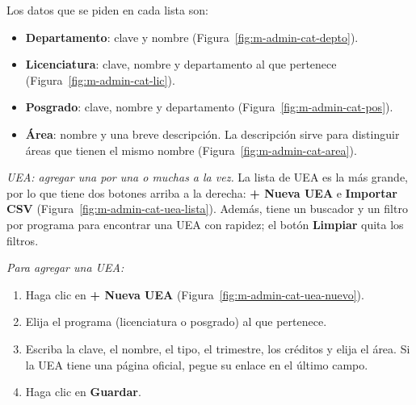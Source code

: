 Los datos que se piden en cada lista son:

\begin{itemize}
    \item \textbf{Departamento}: clave y nombre (Figura~\ref{fig:m-admin-cat-depto}).
    \item \textbf{Licenciatura}: clave, nombre y departamento al que pertenece (Figura~\ref{fig:m-admin-cat-lic}).
    \item \textbf{Posgrado}: clave, nombre y departamento (Figura~\ref{fig:m-admin-cat-pos}).
    \item \textbf{Área}: nombre y una breve descripción. La descripción sirve para distinguir áreas que tienen el mismo nombre (Figura~\ref{fig:m-admin-cat-area}).
\end{itemize}





\textit{UEA: agregar una por una o muchas a la vez.} La lista de UEA es la más grande, por lo que tiene dos botones arriba a la derecha: \textbf{+ Nueva UEA} e \textbf{Importar CSV} (Figura~\ref{fig:m-admin-cat-uea-lista}). Además, tiene un buscador y un filtro por programa para encontrar una UEA con rapidez; el botón \textbf{Limpiar} quita los filtros.


\textit{Para agregar una UEA:}
\begin{enumerate}
    \item Haga clic en \textbf{+ Nueva UEA} (Figura~\ref{fig:m-admin-cat-uea-nuevo}).
    \item Elija el programa (licenciatura o posgrado) al que pertenece.
    \item Escriba la clave, el nombre, el tipo, el trimestre, los créditos y elija el área. Si la UEA tiene una página oficial, pegue su enlace en el último campo.
    \item Haga clic en \textbf{Guardar}.
\end{enumerate}

